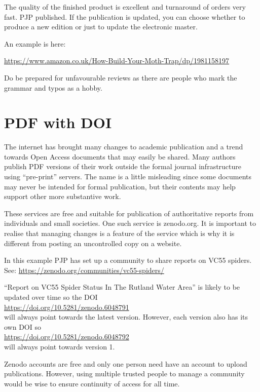 \documentclass{article}
\begin{document}
The quality of the finished product is excellent and turnaround of orders very fast. PJP published. If the publication is updated, you can choose whether to produce a new edition or just to update the electronic master.

An example  is here:

\url{https://www.amazon.co.uk/How-Build-Your-Moth-Trap/dp/1981158197}

Do be prepared for unfavourable reviews as there are people who mark the grammar and typos as a hobby.

\section{PDF with DOI}

The internet has brought many changes to academic publication and a trend towards Open Access documents that may easily be shared. Many authors publish PDF versions of their work outside the formal journal infrastructure using \enquote{pre-print} servers. The name is a little misleading since some documents may never be intended for formal publication, but their contents may help support other more substantive work.

These services are free and suitable for publication of authoritative reports from individuals and small societies. One such service is zenodo.org.  It is important to realise that managing changes is a feature of the service which is why it is different from posting an uncontrolled copy on a website. 

In this example PJP has set up a community to share reports on VC55 spiders. \\
See: \url{https://zenodo.org/communities/vc55-spiders/} 

\enquote{Report on VC55 Spider Status In The Rutland Water Area} is likely to be updated over time so the DOI \\ \url{https://doi.org/10.5281/zenodo.6048791} \\will always point towards the latest version. However, each version also has its own DOI so \\
\url{https://doi.org/10.5281/zenodo.6048792} \\
 will always point towards version 1.

Zenodo accounts are free and only one person need have an account to upload publications. However, using multiple trusted people to manage a community would be wise to ensure continuity of access for all time.




\end{document}

